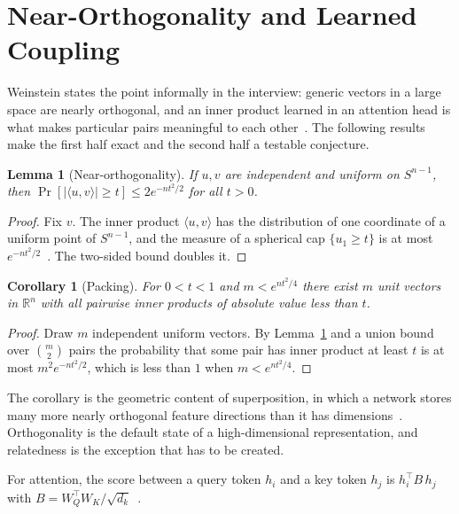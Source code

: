 \documentclass[11pt,a4paper]{article}
\newtheorem{lemma}[theorem]{Lemma}
\newtheorem{corollary}[theorem]{Corollary}
\theoremstyle{definition}
\theoremstyle{remark}
\newcommand{\R}{\mathbb{R}}
\begin{document}
\section{Near-Orthogonality and Learned Coupling}\label{sec:coupling}

Weinstein states the point informally in the interview: generic vectors in
a large space are nearly orthogonal, and an inner product learned in an
attention head is what makes particular pairs meaningful to each
other~\cite{borcherds2026conversation}. The following results make the
first half exact and the second half a testable conjecture.

\begin{lemma}[Near-orthogonality]\label{lem:nearorth}
If $u,v$ are independent and uniform on $S^{n-1}$, then
$\Pr[|\langle u,v\rangle|\ge t]\le 2e^{-nt^2/2}$ for all $t>0$.
\end{lemma}

\begin{proof}
Fix $v$. The inner product $\langle u,v\rangle$ has the distribution of one
coordinate of a uniform point of $S^{n-1}$, and the measure of a spherical
cap $\{u_1\ge t\}$ is at most $e^{-nt^2/2}$~\cite{ball1997elementary}. The
two-sided bound doubles it.
\end{proof}

\begin{corollary}[Packing]\label{cor:packing}
For $0<t<1$ and $m<e^{nt^2/4}$ there exist $m$ unit vectors in $\R^n$ with
all pairwise inner products of absolute value less than $t$.
\end{corollary}

\begin{proof}
Draw $m$ independent uniform vectors. By Lemma~\ref{lem:nearorth} and a
union bound over $\binom m2$ pairs the probability that some pair has inner
product at least $t$ is at most $m^2e^{-nt^2/2}$, which is less than $1$
when $m<e^{nt^2/4}$.
\end{proof}

The corollary is the geometric content of superposition, in which a network
stores many more nearly orthogonal feature directions than it has
dimensions~\cite{elhage2022superposition}. Orthogonality is the default
state of a high-dimensional representation, and relatedness is the
exception that has to be created.

For attention, the score between a query token $h_i$ and a key token $h_j$ is
$h_i^\top B\,h_j$ with $B=W_Q^\top W_K/\sqrt{d_k}$~\cite{vaswani2017attention}.
\end{document}
